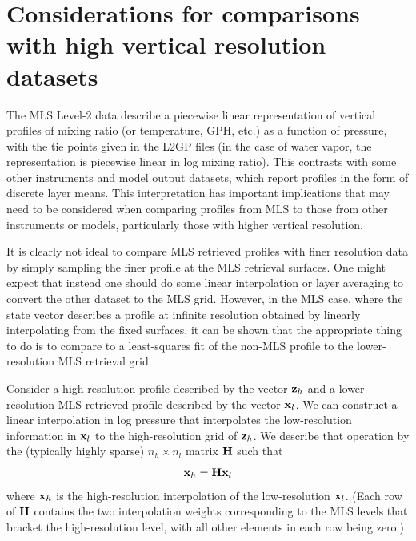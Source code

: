 \section{Considerations for comparisons with high vertical resolution
  datasets}
\label{sec:BasisIssues}

The MLS \mbox{Level-2} data describe a piecewise linear representation of vertical profiles of mixing ratio (or temperature, GPH, etc.) as a function of pressure, with the tie points given in the L2GP files (in the case of water vapor, the representation is piecewise linear in log mixing ratio). This contrasts with some other instruments and model output datasets, which report profiles in the form of discrete layer means. This interpretation has important implications that may need to be considered when comparing profiles from MLS to those from other instruments or models, particularly those with higher vertical resolution.

It is clearly not ideal to compare MLS retrieved profiles with finer resolution data by simply sampling the finer profile at the MLS retrieval surfaces. One might expect that instead one should do some linear interpolation or layer averaging to convert the other dataset to the MLS grid. However, in the MLS case, where the state vector describes a profile at infinite resolution obtained by linearly interpolating from the fixed surfaces, it can be shown that the appropriate thing to do is to compare to a least-squares fit of the non-MLS profile to the lower-resolution MLS retrieval grid.

Consider a high-resolution profile described by the vector $\mathbf{z}_h$ and a lower-resolution MLS retrieved profile described by the vector $\mathbf{x}_l$. We can construct a linear interpolation in log pressure that interpolates the low-resolution information in $\mathbf{x}_l$ to the high-resolution grid of $\mathbf{z}_h$. We describe that operation by the (typically highly sparse) $n_h \times n_l$ matrix $\mathbf{H}$ such that
\begin{equation}
  \mathbf{x}_h = \mathbf{H}\mathbf{x}_l
  \label{eqn:EtaForward}
\end{equation}
where $\mathbf{x}_h$ is the high-resolution interpolation of the low-resolution $\mathbf{x}_l$. (Each row of $\mathbf{H}$ contains the two interpolation weights corresponding to the MLS levels that bracket the high-resolution level, with all other elements in each row being zero.)

